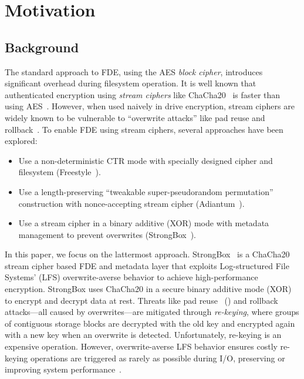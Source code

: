 \section{Motivation}\label{sec:motivation}

\subsection{Background}

The standard approach to FDE, using the AES \emph{block cipher}, introduces
significant overhead during filesystem operation. It is well known that
authenticated encryption using \emph{stream ciphers} like
ChaCha20~\cite{ChaCha20} is faster than using AES~\cite{StrongBox, AnotherPaper,
AnotherPaper}. However, when used naively in drive encryption, stream ciphers
are widely known to be vulnerable to ``overwrite attacks'' like pad reuse and
rollback~\cite{KatzLindell, StrongBox}. To enable FDE using stream ciphers,
several approaches have been explored:

\begin{itemize}
   \item Use a non-deterministic CTR mode with specially designed cipher and
   filesystem (Freestyle~\cite{Freestyle}).
   \item Use a length-preserving ``tweakable super-pseudorandom permutation''
   construction with nonce-accepting stream cipher (Adiantum~\cite{Adiantum}).
   \item Use a stream cipher in a binary additive (XOR) mode with metadata
   management to prevent overwrites (StrongBox~\cite{StrongBox}).
\end{itemize}

In this paper, we focus on the lattermost approach. StrongBox~\cite{StrongBox}
is a ChaCha20 stream cipher based FDE and metadata layer that exploits
Log-structured File Systems' (LFS) overwrite-averse behavior to achieve
high-performance encryption. StrongBox uses ChaCha20 in a secure binary additive
mode (XOR) to encrypt and decrypt data at rest. Threats like pad
reuse~\cite{KatzLindell} () and rollback attacks---all caused
by overwrites---are mitigated through \emph{re-keying}, where groups of
contiguous storage blocks are decrypted with the old key and encrypted again
with a new key when an overwrite is detected. Unfortunately, re-keying is an
expensive operation. However, overwrite-averse LFS behavior ensures costly
re-keying operations are triggered as rarely as possible during I/O, preserving
or improving system performance~\cite{StrongBox}.

